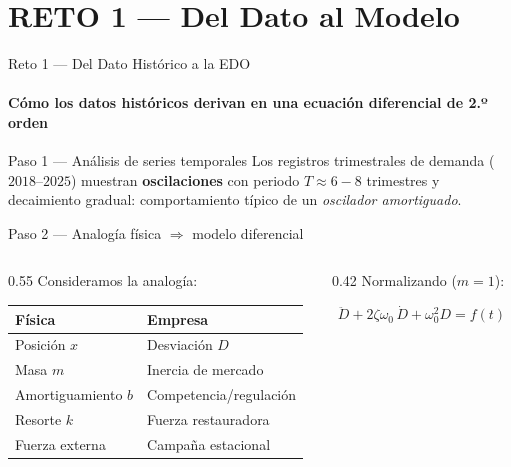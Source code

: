 \documentclass[10pt,aspectratio=169]{beamer}
\begin{document}
\section{RETO 1 — Del Dato al Modelo}

\begin{frame}{Reto 1 — Del Dato Histórico a la EDO}
  \framesubtitle{Cómo los datos históricos derivan en una ecuación diferencial de 2.º orden}

  \begin{block}{Paso 1 — Análisis de series temporales}
    Los registros trimestrales de demanda ($2018$–$2025$) muestran
    \textbf{oscilaciones} con periodo $T \approx 6{-}8$ trimestres y
    decaimiento gradual: comportamiento típico de un \emph{oscilador amortiguado}.
  \end{block}

  \vspace{4pt}
  \begin{block}{Paso 2 — Analogía física $\Rightarrow$ modelo diferencial}
    \begin{columns}[T]
      \begin{column}{0.55\textwidth}
        Consideramos la analogía:
        \begin{center}
        \renewcommand{\arraystretch}{1.3}
        \begin{tabular}{ll}
          \toprule
          \textbf{Física} & \textbf{Empresa} \\
          \midrule
          Posición $x$ & Desviación $D$ \\
          Masa $m$ & Inercia de mercado \\
          Amortiguamiento $b$ & Competencia/regulación \\
          Resorte $k$ & Fuerza restauradora \\
          Fuerza externa & Campaña estacional \\
          \bottomrule
        \end{tabular}
        \end{center}
      \end{column}
      \begin{column}{0.42\textwidth}
        \vspace{6pt}
        Normalizando ($m=1$):
        \begin{tcolorbox}[modelbox={Modelo general}]
          \[
            \ddot{D} + 2\zeta\omega_0\,\dot{D} + \omega_0^2 D
            = f(t)
          \]
        \end{tcolorbox}
      \end{column}
    \end{columns}
  \end{block}
\end{frame}
\end{document}
